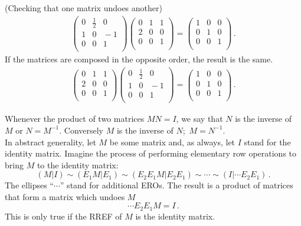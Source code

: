 \begin{example} (Checking that \hypertarget{inversie}{one matrix undoes another})
\begin{eqnarray*}
\left(\begin{array}{rrr}
0&\frac12&0\\
1 &0 &\!\!\!-1\\ 
0  &0 &1\\
\end{array}  \right)
\left(\begin{array}{ccc}
0&1&1\\
2 &0 &0\\ 
0  &0 &1\\
\end{array}  \right)
=
\left(\begin{array}{ccc}
1  &0 &0\\
0  &1 &0\\ 
0  &0 &1\\
\end{array}  \right) \, .
\end{eqnarray*}
If the matrices are composed in the opposite order, the result is the same.
\begin{eqnarray*}
\left(\begin{array}{ccc}
0&1&1\\
2 &0 &0\\ 
0  &0 &1\\
\end{array}  \right)
\left(\begin{array}{ccr}
0&\frac12&0\\
1 &0 &\!\!\!-1\\ 
0  &0 &1\\
\end{array}  \right)
=
\left(\begin{array}{ccc}
1  &0 &0\\
0  &1 &0\\ 
0  &0 &1\\
\end{array}  \right) \, .
\end{eqnarray*}
\end{example}


Whenever the product of two matrices $MN=I$, we say that  $N$ is the inverse of $M$ or $N=M^{-1}$. 
Conversely $M$ is the inverse of $N$;~$M=N^{-1}$.\\



In abstract generality, let $M$ be some matrix and, as always, let $I$ stand for the identity matrix. Imagine the process of performing elementary row operations to bring $M$ to the identity matrix: 
\begin{equation*}
(M | I) \sim ( E_1M| E_1)\sim (E_2E_1 M | E_2 E_1) \sim \cdots \sim (I | \cdots E_2E_1 )\, .
\end{equation*}
The ellipses ``$\cdots$'' stand for additional EROs. The result is a product of matrices that form a matrix which undoes $M$
\begin{equation*}
\cdots E_2 E_1 M =  I \, .
\end{equation*}
This is only true if the RREF of $M$ is the identity matrix.  \\

